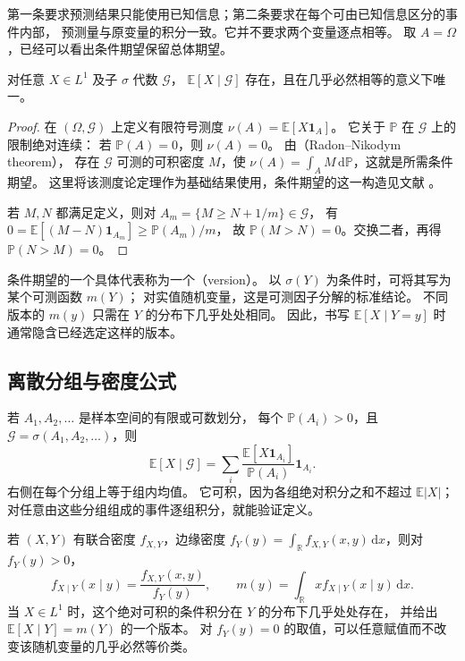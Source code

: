 \documentclass[UTF8]{ctexart}
\begin{document}
第一条要求预测结果只能使用已知信息；第二条要求在每个可由已知信息区分的事件内部，
预测量与原变量的积分一致。它并不要求两个变量逐点相等。
取 $A=\Omega$，已经可以看出条件期望保留总体期望。

\begin{theorem}[存在性与几乎必然唯一性]
\label{thm:conditional-existence}
对任意 $X\in L^1$ 及子 $\sigma$ 代数 $\mathcal G$，
$\mathbb E[X\mid\mathcal G]$ 存在，且在几乎必然相等的意义下唯一。
\end{theorem}

\begin{proof}
在 $(\Omega,\mathcal G)$ 上定义有限符号测度
$\nu(A)=\mathbb E[X\mathbf1_A]$。
它关于 $\mathbb P$ 在 $\mathcal G$ 上的限制绝对连续：
若 $\mathbb P(A)=0$，则 $\nu(A)=0$。
由（Radon--Nikodym theorem），
存在 $\mathcal G$ 可测的可积密度 $M$，使
$\nu(A)=\int_A M\,\mathrm d\mathbb P$，这就是所需条件期望。
这里将该测度论定理作为基础结果使用，条件期望的这一构造见文献 \cite[第 4.1 节]{durrett-pte}。

若 $M,N$ 都满足定义，则对 $A_m=\{M\geq N+1/m\}\in\mathcal G$，
有 $0=\mathbb E[(M-N)\mathbf1_{A_m}]\geq\mathbb P(A_m)/m$，
故 $\mathbb P(M>N)=0$。交换二者，再得 $\mathbb P(N>M)=0$。
\end{proof}

条件期望的一个具体代表称为一个（version）。
以 $\sigma(Y)$ 为条件时，可将其写为某个可测函数 $m(Y)$；
对实值随机变量，这是可测因子分解的标准结论。
不同版本的 $m(y)$ 只需在 $Y$ 的分布下几乎处处相同。
因此，书写 $\mathbb E[X\mid Y=y]$ 时通常隐含已经选定这样的版本。

\subsection{离散分组与密度公式}

若 $A_1,A_2,\ldots$ 是样本空间的有限或可数划分，
每个 $\mathbb P(A_i)>0$，且 $\mathcal G=\sigma(A_1,A_2,\ldots)$，则
\begin{equation}
  \mathbb E[X\mid\mathcal G]
  =\sum_i
    \frac{\mathbb E[X\mathbf1_{A_i}]}{\mathbb P(A_i)}\mathbf1_{A_i}.
  \label{eq:conditional-partition}
\end{equation}
右侧在每个分组上等于组内均值。
它可积，因为各组绝对积分之和不超过 $\mathbb E|X|$；
对任意由这些分组组成的事件逐组积分，就能验证定义。

若 $(X,Y)$ 有联合密度 $f_{X,Y}$，边缘密度
$f_Y(y)=\int_{\mathbb R}f_{X,Y}(x,y)\,\mathrm dx$，则对 $f_Y(y)>0$，
\[
  f_{X\mid Y}(x\mid y)=\frac{f_{X,Y}(x,y)}{f_Y(y)},\qquad
  m(y)=\int_{\mathbb R}x f_{X\mid Y}(x\mid y)\,\mathrm dx.
\]
当 $X\in L^1$ 时，这个绝对可积的条件积分在 $Y$ 的分布下几乎处处存在，
并给出 $\mathbb E[X\mid Y]=m(Y)$ 的一个版本。
对 $f_Y(y)=0$ 的取值，可以任意赋值而不改变该随机变量的几乎必然等价类。
\end{document}
